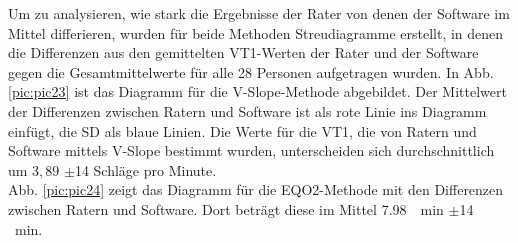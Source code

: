 %
Um zu analysieren, wie stark die Ergebnisse der Rater von denen der Software im Mittel differieren, wurden für beide Methoden Streudiagramme erstellt, in denen die Differenzen aus den gemittelten VT1-Werten der Rater und der Software gegen die Gesamtmittelwerte für alle 28 Personen aufgetragen wurden. In Abb. \ref{pic:pic23} ist das Diagramm für die V-Slope-Methode abgebildet. Der Mittelwert der Differenzen zwischen Ratern und Software ist als rote Linie ins Diagramm einfügt, die \gls{SD} als blaue Linien. Die Werte für die VT1, die von Ratern und Software mittels V-Slope bestimmt wurden, unterscheiden sich durchschnittlich um $3,89$ $\pm$14 Schläge pro Minute.\\
Abb. \ref{pic:pic24} zeigt das Diagramm für die \gls{EQO2}-Methode mit den Differenzen zwischen Ratern und Software. Dort beträgt diese im Mittel \SI{7,98}{\per\minute} $\pm$14 \si{\per\minute}.
%
